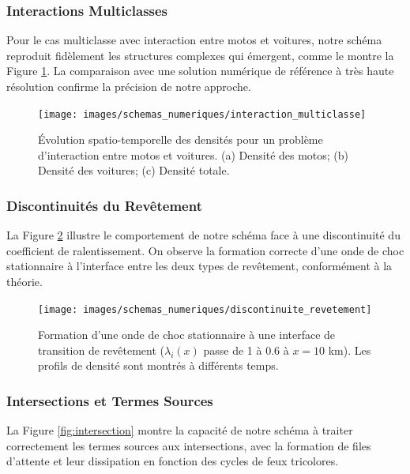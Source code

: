 \subsubsection{Interactions Multiclasses}
\label{subsubsec:interactions_multiclasses}

Pour le cas multiclasse avec interaction entre motos et voitures, notre schéma reproduit fidèlement les structures complexes qui émergent, comme le montre la Figure \ref{fig:interaction_multiclasse}. La comparaison avec une solution numérique de référence à très haute résolution confirme la précision de notre approche.

\begin{figure}[htbp]
\centering
\texttt{[image: images/schemas\_numeriques/interaction\_multiclasse]}
\caption{Évolution spatio-temporelle des densités pour un problème d'interaction entre motos et voitures. (a) Densité des motos; (b) Densité des voitures; (c) Densité totale.}
\label{fig:interaction_multiclasse}
\end{figure}

\subsubsection{Discontinuités du Revêtement}
\label{subsubsec:discontinuites_revetement_test}

La Figure \ref{fig:discontinuite_revetement} illustre le comportement de notre schéma face à une discontinuité du coefficient de ralentissement. On observe la formation correcte d'une onde de choc stationnaire à l'interface entre les deux types de revêtement, conformément à la théorie.

\begin{figure}[htbp]
\centering
\texttt{[image: images/schemas\_numeriques/discontinuite\_revetement]}
\caption{Formation d'une onde de choc stationnaire à une interface de transition de revêtement ($\lambda_i(x)$ passe de 1 à 0.6 à $x=10$ km). Les profils de densité sont montrés à différents temps.}
\label{fig:discontinuite_revetement}
\end{figure}

\subsubsection{Intersections et Termes Sources}
\label{subsubsec:intersections_test}

La Figure \ref{fig:intersection} montre la capacité de notre schéma à traiter correctement les termes sources aux intersections, avec la formation de files d'attente et leur dissipation en fonction des cycles de feux tricolores.

